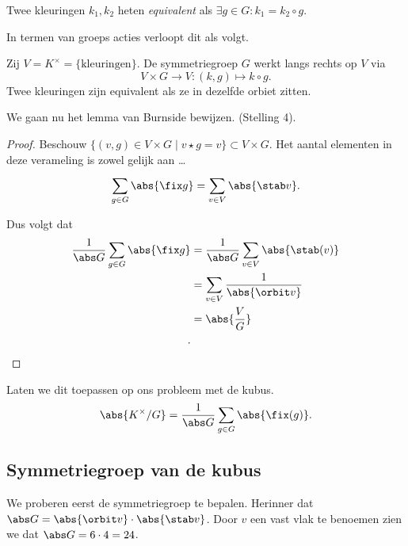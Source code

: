 \begin{definitie}
	Twee kleuringen $k_1, k_2$ heten \emph{equivalent} als $\exists g \in G: k_1 = k_2 \circ g$.
\end{definitie}
In termen van groeps acties verloopt dit als volgt. 
\begin{definitie}
	Zij $V = K^\times = \{\text{kleuringen}\} $. 
	De symmetriegroep  $G$ werkt langs rechts op $V$ via \[
		V \times  G \to V: (k, g) \mapsto  k \circ g
	.\] 
	Twee kleuringen zijn equivalent als ze in dezelfde orbiet zitten. 
\end{definitie}

We gaan nu het lemma van Burnside bewijzen. (Stelling 4).
\begin{proof}
	Beschouw $\{(v, g) \in V \times  G \;|\; v \star g = v\} \subset V \times G$. 
	Het aantal elementen in deze verameling is zowel gelijk aan \ldots
	\[
		\sum_{g \in G}^{} \abs{\fix g} = \sum_{v \in V} \abs{\stab v}
	.\] 

	Dus volgt dat 
	\begin{align*}
		\frac{1}{\abs G} \sum_{g \in G} \abs{ \fix g} &= \frac{1}{\abs G} \sum_{v \in V} \abs{\stab(v)} \\
							      &= \sum_{v \in V} \frac{1}{\abs{\orbit v}} \\
							      &= \abs{\frac{V}{G}} \\
	.\end{align*}
\end{proof}

Laten we dit toepassen op ons probleem met de kubus.
\begin{align*}
	\abs{K^{\times }/ G} = \frac{1}{\abs G } \sum_{g \in G}\abs{\fix(g)}
.\end{align*}

\subsection{Symmetriegroep van de kubus} \label{sec:symmetriegroep_van_de_kubus}

We proberen eerst de symmetriegroep te bepalen. Herinner dat $\abs G = \abs{ \orbit v} \cdot \abs{ \stab v}$. Door $v$ een vast vlak te benoemen zien we dat  $\abs G = 6\cdot 4 = 24$. 

